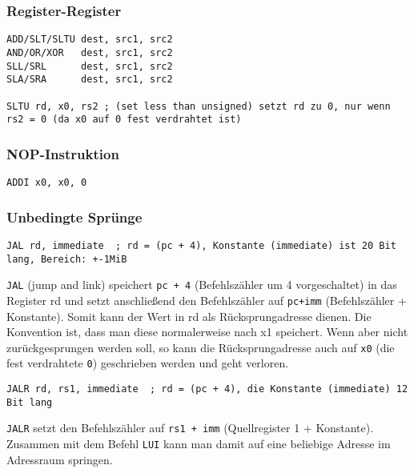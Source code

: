 \subsubsection{Register-Register}

\begin{lstlisting}[style=risc-v_Assembler]
ADD/SLT/SLTU dest, src1, src2
AND/OR/XOR   dest, src1, src2
SLL/SRL      dest, src1, src2
SLA/SRA      dest, src1, src2

SLTU rd, x0, rs2 ; (set less than unsigned) setzt rd zu 0, nur wenn rs2 = 0 (da x0 auf 0 fest verdrahtet ist)
\end{lstlisting}

\subsubsection{NOP-Instruktion}

\begin{lstlisting}[style=risc-v_Assembler]
ADDI x0, x0, 0
\end{lstlisting}

\subsubsection{Unbedingte Sprünge}

\begin{lstlisting}[style=risc-v_Assembler]
JAL rd, immediate  ; rd = (pc + 4), Konstante (immediate) ist 20 Bit lang, Bereich: +-1MiB
\end{lstlisting}

\lstinline[style=risc-v_Assembler]!JAL! (jump and link) speichert \lstinline[style=risc-v_Assembler]!pc + 4! (Befehlszähler um 4 vorgeschaltet) in das Register rd und setzt anschließend den Befehlszähler auf \lstinline[style=risc-v_Assembler]!pc+imm! (Befehlszähler + Konstante). Somit kann der Wert in rd als Rücksprungadresse dienen. Die Konvention ist, dass man diese normalerweise nach x1 speichert. Wenn aber nicht zurückgesprungen werden soll, so kann die Rücksprungadresse auch auf \lstinline[style=risc-v_Assembler]!x0! (die fest verdrahtete \lstinline[style=risc-v_Assembler]!0!) geschrieben werden und geht verloren.

\begin{lstlisting}[style=risc-v_Assembler]
JALR rd, rs1, immediate  ; rd = (pc + 4), die Konstante (immediate) 12 Bit lang
\end{lstlisting}

\lstinline[style=risc-v_Assembler]!JALR! setzt den Befehlszähler auf \lstinline[style=risc-v_Assembler]!rs1 + imm! (Quellregister 1 + Konstante). Zusammen mit dem Befehl \lstinline[style=risc-v_Assembler]!LUI! kann
man damit auf eine beliebige Adresse im Adressraum springen.

